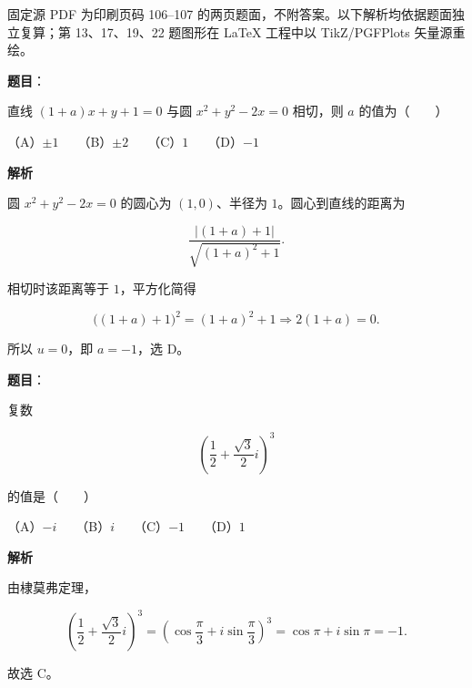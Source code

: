 

\begin{gktip}
固定源 PDF 为印刷页码 106–107 的两页题面，不附答案。以下解析均依据题面独立复算；第 13、17、19、22 题图形在 LaTeX 工程中以 TikZ/PGFPlots 矢量源重绘。
\end{gktip}


\begin{answer}

\textbf{题目}：

直线 $(1+a)x+y+1=0$ 与圆 $x^2+y^2-2x=0$ 相切，则 $a$ 的值为\mbox{（　　）}

（A）$\pm1$　　（B）$\pm2$　　（C）$1$　　（D）$-1$

\textbf{解析}

圆 $x^2+y^2-2x=0$ 的圆心为 $(1,0)$、半径为 $1$。圆心到直线的距离为

\nopagebreak[4]
\[
\frac{|(1+a)+1|}{\sqrt{(1+a)^2+1}}.
\]

相切时该距离等于 $1$，平方化简得

\nopagebreak[4]
\[
\bigl((1+a)+1\bigr)^2=(1+a)^2+1
\Longrightarrow 2(1+a)=0.
\]

所以 $u=0$，即 $a=-1$，选 D。


\end{answer}
\begin{answer}

\textbf{题目}：

复数

\nopagebreak[4]
\[
\left(\frac12+\frac{\sqrt3}{2}i\right)^3
\]

的值是\mbox{（　　）}

（A）$-i$　　（B）$i$　　（C）$-1$　　（D）$1$

\textbf{解析}

由棣莫弗定理，

\nopagebreak[4]
\[
\left(\frac12+\frac{\sqrt3}{2}i\right)^3
=\left(\cos\frac\pi3+i\sin\frac\pi3\right)^3
=\cos\pi+i\sin\pi=-1.
\]

故选 C。


\end{answer}
